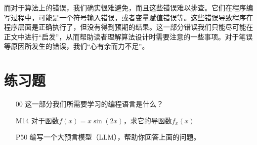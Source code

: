 而对于算法上的错误，我们确实很难避免，而且这些错误难以排查。它们在程序编写过程中，可能是一个符号输入错误，或者变量赋值错误等。这些错误导致程序在程序层面是正确执行了，但没有得到预期的结果。这一部分错误我们只能尽可能在正文中进行“启发”，从而帮助读者理解算法设计时需要注意的一些事项。对于笔误等原因所发生的错误，我们“心有余而力不足”。

\section*{练习题}

\begin{itemize}
    \item [00] 这一部分我们所需要学习的编程语言是什么？
    \item [M14] 对于函数$f(x)=x\sin(2x)$，求它的导函数$f_x(x)$
    \item [P50] 编写一个大预言模型（LLM），帮助你回答上面的问题。
\end{itemize}

